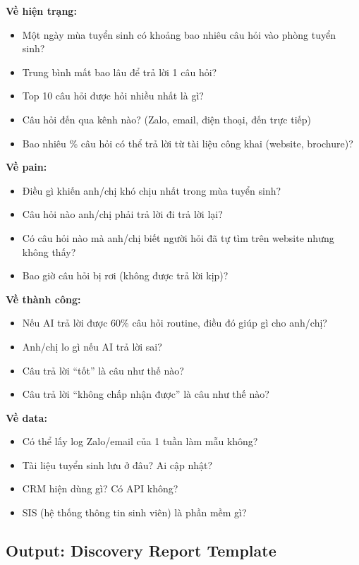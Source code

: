 \documentclass[11pt,a4paper]{article}
\begin{document}
\begin{tpl}[title=Discovery questions — Admissions]
\textbf{Về hiện trạng:}
\begin{itemize}
\item Một ngày mùa tuyển sinh có khoảng bao nhiêu câu hỏi vào phòng tuyển sinh?
\item Trung bình mất bao lâu để trả lời 1 câu hỏi?
\item Top 10 câu hỏi được hỏi nhiều nhất là gì?
\item Câu hỏi đến qua kênh nào? (Zalo, email, điện thoại, đến trực tiếp)
\item Bao nhiêu \% câu hỏi có thể trả lời từ tài liệu công khai (website, brochure)?
\end{itemize}
\textbf{Về pain:}
\begin{itemize}
\item Điều gì khiến anh/chị khó chịu nhất trong mùa tuyển sinh?
\item Câu hỏi nào anh/chị phải trả lời đi trả lời lại?
\item Có câu hỏi nào mà anh/chị biết người hỏi đã tự tìm trên website nhưng không thấy?
\item Bao giờ câu hỏi bị rơi (không được trả lời kịp)?
\end{itemize}
\textbf{Về thành công:}
\begin{itemize}
\item Nếu AI trả lời được 60\% câu hỏi routine, điều đó giúp gì cho anh/chị?
\item Anh/chị lo gì nếu AI trả lời sai?
\item Câu trả lời ``tốt'' là câu như thế nào?
\item Câu trả lời ``không chấp nhận được'' là câu như thế nào?
\end{itemize}
\textbf{Về data:}
\begin{itemize}
\item Có thể lấy log Zalo/email của 1 tuần làm mẫu không?
\item Tài liệu tuyển sinh lưu ở đâu? Ai cập nhật?
\item CRM hiện dùng gì? Có API không?
\item SIS (hệ thống thông tin sinh viên) là phần mềm gì?
\end{itemize}
\end{tpl}

\subsection{Output: Discovery Report Template}
\end{document}
